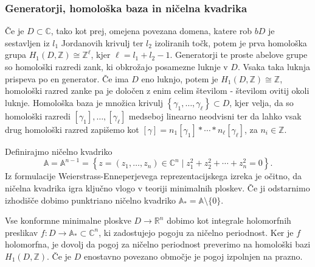 \documentclass[8pt]{beamer}
\theoremstyle{definition}
\theoremstyle{remark}
\theoremstyle{plain}
\numberwithin{equation}{section}  %
\begin{document}
\begin{frame}
    \frametitle{Generatorji, homološka baza in ničelna kvadrika}

    Če je $D \subset \mathbb{C}$, tako kot prej, omejena povezana domena, katere rob $b D$ je sestavljen iz $l_1$ Jordanovih krivulj ter $l_2$ izoliranih točk, potem je prva homološka grupa $H_1(D, \mathbb{Z}) \cong\mathbb{Z}^\ell$, kjer $\ell = l_1 + l_2 - 1$. \textcolor{red1}{Generatorji} te proste abelove grupe so homološki razredi zank, ki obkrožajo posamezne luknje v $D$. Vsaka taka luknja prispeva po en generator. Če ima $D$ eno luknjo, potem je $H_1(D, \mathbb{Z}) \cong \mathbb{Z}$, homološki razred zanke pa je določen z enim celim številom - številom ovitij okoli luknje. \textcolor{red1}{Homološka baza} je množica krivulj $\left\{\gamma_1, \ldots, \gamma_{\ell}\right\} \subset D$, kjer velja, da so homološki razredi $\left[\gamma_1\right], \ldots,\left[\gamma_{\ell}\right]$ medseboj linearno neodvisni ter da lahko vsak drug homološki razred zapišemo kot $[\gamma]=n_1\left[\gamma_1\right]*\cdots*n_{\ell}\left[\gamma_{\ell}\right]$,  za $n_i \in \mathbb{Z}$.
    
    \vspace{0.8em}

    Definirajmo \textcolor{red1}{ničelno kvadriko} 
    \begin{equation*}
        \mathbb{A}=\mathbb{A}^{n-1}=\left\{z=\left(z_1, \ldots, z_n\right) \in \mathbb{C}^n \mid z_1^2+z_2^2+\cdots+z_n^2=0\right\}.    
    \end{equation*}
    Iz formulacije Weierstrass-Enneperjevega reprezentacijskega izreka je očitno, da ničelna kvadrika igra ključno vlogo v teoriji minimalnih ploskev. Če ji odstarnimo izhodišče dobimo \textcolor{red1}{punktriano ničelno kvadriko} $\mathbb{A}_*=\mathbb{A} \setminus \{0\}$. 
    
    \vspace{0.8em}
    
    Vse konformne minimalne ploskve $D \rightarrow \mathbb{R}^n$ dobimo kot integrale holomorfnih preslikav $f: D \rightarrow \mathbb{A}_* \subset \mathbb{C}^n$, ki zadostujejo pogoju za ničelno periodnost. Ker je $f$ holomorfna, je dovolj da pogoj za ničelno periodnost preverimo na homološki bazi $H_1(D, \mathbb{Z})$. Če je $D$ enostavno povezano območje je pogoj izpolnjen na prazno. 
    
    
\end{frame}
\end{document}
